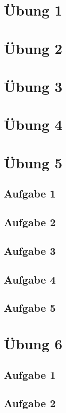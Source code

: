 \documentclass[a4paper,12pt,twoside]{article}
\theoremstyle{definition}
\begin{document}
	\tableofcontents\label{toc}

\section{Übung 1}
\section{Übung 2}
\section{Übung 3}
\section{Übung 4}
\newpage

\section{Übung 5}
\subsection{Aufgabe 1}
\subsection{Aufgabe 2}
\subsection{Aufgabe 3}
\subsection{Aufgabe 4}
\subsection{Aufgabe 5}


\newpage
\section{Übung 6}
\subsection{Aufgabe 1}
\subsection{Aufgabe 2}

\end{document}
